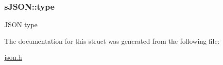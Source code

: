 \subsubsection[{\texorpdfstring{type}{type}}]{ s\+J\+S\+O\+N\+::type}\hypertarget{structsJSON_addb339436be83da160932a530dce47d1}{}\label{structsJSON_addb339436be83da160932a530dce47d1}
J\+S\+ON type 

The documentation for this struct was generated from the following file\+:\begin{DoxyCompactItemize}
\item 
\hyperlink{json_8h}{json.\+h}\end{DoxyCompactItemize}
